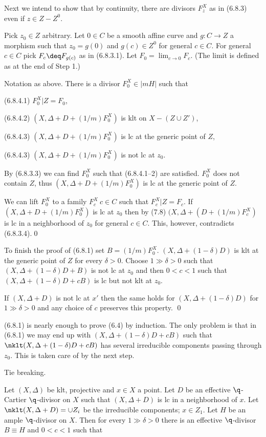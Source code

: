 Next we intend to show that  by continuity, there are divisors $F_z^X$
as in (6.8.3) even if $z\in Z-Z^0$.


 Pick $z_0\in Z$
arbitrary. Let $0\in C$ be a smooth affine  curve and $g:C\to Z$ a
morphism such that $z_0=g(0)$ and $g(c)\in Z^0$ for general $c\in C$. For
general $c\in C$ pick
$F_c\deq F_{g(c)}$ as in (6.8.3.1). Let
$F_0=\lim_{c\to 0} F_c$. (The limit is defined as at the end of Step 1.)

 Notation as above.  There is a divisor $F_0^X\in
|mH|$ such that

(6.8.4.1) $F_0^X|Z=F_0$,

(6.8.4.2) $(X,\Delta+D+(1/m)F_0^X)$
is klt  on $X-(Z\cup Z')$,

(6.8.4.3) $(X,\Delta+D+(1/m)F_0^X)$ is lc at the generic point of $Z$,

(6.8.4.3) $(X,\Delta+D+(1/m)F_0^X)$ is not lc at $z_0$.
\endproclaim

\demop By (6.8.3.3) we can find   $F_0^X$ such that (6.8.4.1--2) are
satisfied.
$F_0^X$ does not contain $Z$, thus  $(X,\Delta+D+(1/m)F_0^X)$ is lc at the
generic point of $Z$.  

We can lift $F_0^X$ to a family $F_c^X\: c\in C$ such that  $F_c^X|Z=F_c$. If 
$(X,\Delta+D+(1/m)F_0^X)$ is lc at $z_0$ then  by (7.8) 
$(X,\Delta+(D+(1/m)F_c^X)$ is lc in a neighborhood of $z_0$
for general $c\in C$. This, however, contradicts (6.8.3.4).\qed\enddemo


To finish the proof of (6.8.1) set $B=(1/m)F_0^X$. 
$(X,\Delta+(1-\delta)D)$ is klt at the generic point of $Z$ for every 
 $\delta>0$.   Choose
$1\gg \delta>0$ such that   
$(X,\Delta+(1-\delta)D+B)$ is not lc at $z_0$ and then $0<c<1$
such that $(X,\Delta+(1-\delta)D+cB)$ is   lc but not klt at $z_0$.

If $(X,\Delta+D)$ is not lc at $x'$ then the same holds  for
$(X,\Delta+(1-\delta)D)$ for $1\gg\delta>0$ and any choice of $c$
preserves this property. \qed\enddemo\enddemo


(6.8.1) is nearly enough to prove (6.4) by induction. The only problem is
that in (6.8.1) we may end up with $(X,\Delta+(1-\delta)D+cB)$
such that $\nklt(X,\Delta+(1-\delta)D+cB)$ has several irreducible
components passing through $z_0$. This is taken care of by the next step.


 Tie breaking.


  Let  $(X,\Delta)$ be  klt,  projective and
$x\in X$ a  point. Let $D$ be an effective $\q$-Cartier $\q$-divisor on $X$
such that 
$(X,\Delta+D)$ is lc in a neighborhood of $x$.
Let
$\nklt(X,\Delta+D)=\cup Z_i$ be the irreducible components; $x\in Z_1$.  Let
$H$ be an ample $\q$-divisor on
$X$. Then for every $1\gg \delta>0$   there is an effective
$\q$-divisor
$B\equiv
 H$   and $0<c<1$ such that 

